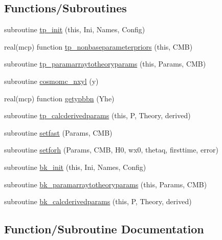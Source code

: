 \subsection*{Functions/\+Subroutines}
\begin{DoxyCompactItemize}
\item 
subroutine \mbox{\hyperlink{namespacecosmologyparameterizations_aa546897820fdf873fd19e45f5fe496e3}{tp\+\_\+init}} (this, Ini, Names, Config)
\item 
real(mcp) function \mbox{\hyperlink{namespacecosmologyparameterizations_a7fdf867e0581b872103682d4364bc00c}{tp\+\_\+nonbaseparameterpriors}} (this, C\+MB)
\item 
subroutine \mbox{\hyperlink{namespacecosmologyparameterizations_afad6169e49a1cd77b2d4aa147b2db537}{tp\+\_\+paramarraytotheoryparams}} (this, Params, C\+MB)
\item 
subroutine \mbox{\hyperlink{namespacecosmologyparameterizations_ae660404b993706170ddf14a2a0904812}{cosmomc\+\_\+nxyl}} (y)
\item 
real(mcp) function \mbox{\hyperlink{namespacecosmologyparameterizations_a211ef353fd86e7f656da5d1ee63e96de}{getypbbn}} (Yhe)
\item 
subroutine \mbox{\hyperlink{namespacecosmologyparameterizations_aeedc92b3479b3427db06f0770e7c13c0}{tp\+\_\+calcderivedparams}} (this, P, Theory, derived)
\item 
subroutine \mbox{\hyperlink{namespacecosmologyparameterizations_a125ded7f9054c23924b78956a86e21af}{setfast}} (Params, C\+MB)
\item 
subroutine \mbox{\hyperlink{namespacecosmologyparameterizations_a4269c5d3027267744bdf4404d32a9db0}{setforh}} (Params, C\+MB, H0, wx0, thetaq, firsttime, error)
\item 
subroutine \mbox{\hyperlink{namespacecosmologyparameterizations_a8bcd41b19d9c19fa07665660352182b8}{bk\+\_\+init}} (this, Ini, Names, Config)
\item 
subroutine \mbox{\hyperlink{namespacecosmologyparameterizations_a24c7011e1628164c2a2742b41a0fd48e}{bk\+\_\+paramarraytotheoryparams}} (this, Params, C\+MB)
\item 
subroutine \mbox{\hyperlink{namespacecosmologyparameterizations_a70a404faf744a903a55fc6444af6863c}{bk\+\_\+calcderivedparams}} (this, P, Theory, derived)
\end{DoxyCompactItemize}


\subsection{Function/\+Subroutine Documentation}
\mbox{\label{namespacecosmologyparameterizations_a70a404faf744a903a55fc6444af6863c}} 
